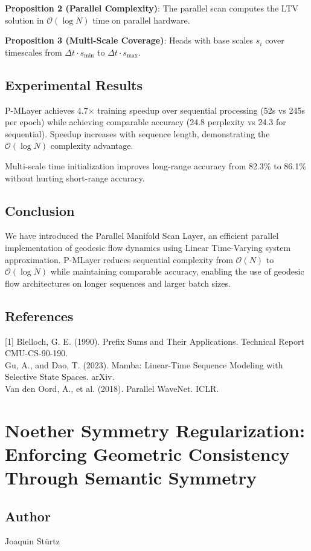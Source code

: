 \textbf{Proposition 2 (Parallel Complexity)}: The parallel scan computes the LTV solution in $\mathcal{O}(\log N)$ time on parallel hardware.

\textbf{Proposition 3 (Multi-Scale Coverage)}: Heads with base scales $s_i$ cover timescales from $\Delta t \cdot s_{\min}$ to $\Delta t \cdot s_{\max}$.

\subsection{Experimental Results}
P-MLayer achieves 4.7× training speedup over sequential processing (52s vs 245s per epoch) while achieving comparable accuracy (24.8 perplexity vs 24.3 for sequential). Speedup increases with sequence length, demonstrating the $\mathcal{O}(\log N)$ complexity advantage.

Multi-scale time initialization improves long-range accuracy from 82.3\% to 86.1\% without hurting short-range accuracy.

\subsection{Conclusion}
We have introduced the Parallel Manifold Scan Layer, an efficient parallel implementation of geodesic flow dynamics using Linear Time-Varying system approximation. P-MLayer reduces sequential complexity from $\mathcal{O}(N)$ to $\mathcal{O}(\log N)$ while maintaining comparable accuracy, enabling the use of geodesic flow architectures on longer sequences and larger batch sizes.

\subsection*{References}
[1] Blelloch, G. E. (1990). Prefix Sums and Their Applications. Technical Report CMU-CS-90-190.\\
[2] Gu, A., and Dao, T. (2023). Mamba: Linear-Time Sequence Modeling with Selective State Spaces. arXiv.\\
[3] Van den Oord, A., et al. (2018). Parallel WaveNet. ICLR.

\section{Noether Symmetry Regularization: Enforcing Geometric Consistency Through Semantic Symmetry}
\subsection*{Author}
Joaquin Stürtz
